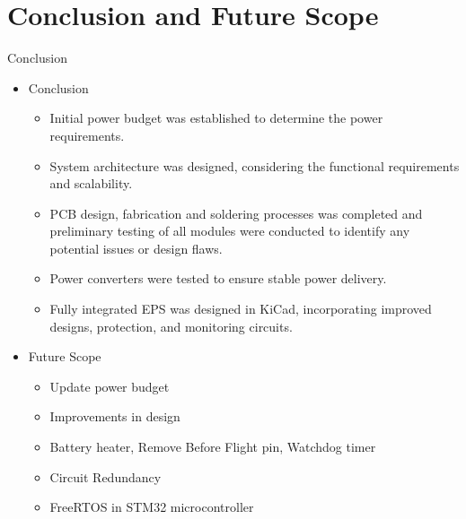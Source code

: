\documentclass[aspectratio=169]{beamer}
\begin{document}
			\section{Conclusion and Future Scope}
			\begin{frame}{Conclusion}
				\begin{itemize}
					\item Conclusion
					\begin{itemize}
						\item Initial power budget was established to determine the power requirements.   
						\item System architecture was designed, considering the functional requirements and scalability.
						\item PCB design, fabrication and soldering processes was completed and preliminary testing of all modules were conducted to identify any potential issues or design flaws.
						\item  Power converters were tested to ensure stable power delivery.
						\item Fully integrated EPS was designed in KiCad, incorporating improved designs, protection, and monitoring circuits.
					\end{itemize}
				\end{itemize}
				\begin{itemize}
					\item Future Scope
					\begin{itemize}
						\item Update power budget
						\item Improvements in design
						\item Battery heater, Remove Before Flight pin, Watchdog timer
						\item Circuit Redundancy
						\item FreeRTOS in STM32 microcontroller
					\end{itemize}
				\end{itemize}
			\end{frame}
			
\end{document}
